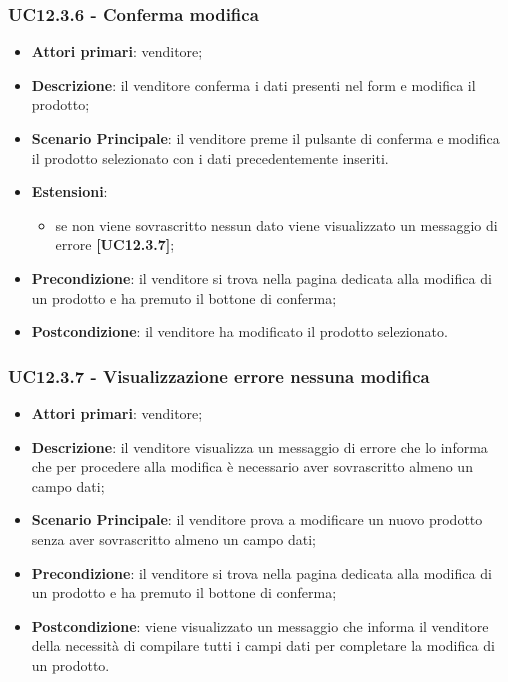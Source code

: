 \subsubsection{UC12.3.6 - Conferma modifica}
\begin{itemize}
\item \textbf{Attori primari}: venditore;
\item \textbf{Descrizione}: il venditore conferma i dati presenti nel form e modifica il prodotto;
\item \textbf{Scenario Principale}: il venditore preme il pulsante di conferma e modifica il prodotto selezionato con i dati precedentemente inseriti.
\item \textbf{Estensioni}: 
\begin{itemize}
	\item se non viene sovrascritto nessun dato viene visualizzato un messaggio di errore \textbf{[UC12.3.7]};
\end{itemize} 
\item \textbf{Precondizione}: il venditore si trova nella pagina dedicata alla modifica di un prodotto e ha premuto il bottone di conferma;
\item \textbf{Postcondizione}: il venditore ha modificato il prodotto selezionato.
\end{itemize}

\subsubsection{UC12.3.7 - Visualizzazione errore nessuna modifica}
\begin{itemize}
\item \textbf{Attori primari}: venditore;
\item \textbf{Descrizione}: il venditore visualizza un messaggio di errore che lo informa che per procedere alla modifica è necessario aver sovrascritto almeno un campo dati;
\item \textbf{Scenario Principale}: il venditore prova a modificare un nuovo prodotto senza aver sovrascritto almeno un campo dati;
\item \textbf{Precondizione}: il venditore si trova nella pagina dedicata alla modifica di un prodotto e ha premuto il bottone di conferma;
\item \textbf{Postcondizione}: viene visualizzato un messaggio che informa il venditore della necessità di compilare tutti i campi dati per completare la modifica di un prodotto.
\end{itemize}

